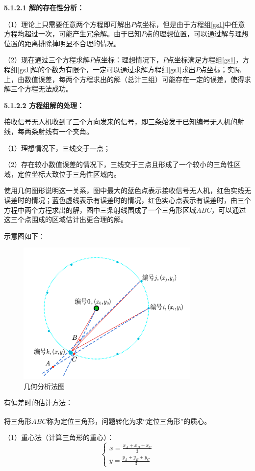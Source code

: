 \documentclass[12pt]{ctexart}
\newcommand\supercite[1]{\textsuperscript{\cite{#1}}}
\begin{document}
\begin{spacing}{1.5}
\textbf{5.1.2.1 解的存在性分析：}

（1）理论上只需要任意两个方程即可解出$P$点坐标，但是由于方程组\ref{gs1}中任意方程均超过一次，可能产生冗余解。由于已知$P$点的理想位置，可以通过解与理想位置的距离排除掉明显不合理的情况。

（2）现在通过三个方程求解$P$点坐标：理想情况下，$P$点坐标满足方程组\ref{gs1}，方程组\ref{gs1}解的个数为有限个，一定可以通过求解方程组\ref{gs1}求出$P$点坐标；实际上，由数值误差，每两个方程求出的解（总计三组）可能存在一定的误差，使得求解三个方程无法成功。

\textbf{5.1.2.2 方程组解的处理：}

接收信号无人机收到了三个方向发来的信号，即三条始发于已知编号无人机的射线，每两条射线有一个夹角。

（1）理想情况下，三线交于一点；

（2）存在较小数值误差的情况下，三线交于三点且形成了一个较小的三角性区域，定位坐标大致位于三角性区域内。

使用几何图形说明这一关系，图中最大的蓝色点表示接收信号无人机，红色实线无误差时的情况；蓝色虚线表示有误差时的情况，红色实心点表示有误差时，由三个方程中两个方程求出的解，图中三条射线围成了一个三角形区域$ABC$，可以通过这三个点围成的区域估计出更合理的解。

示意图如下：
\begin{figure}[H]
	\centering
	\includegraphics[width=0.8\textwidth]{几何分析法图.png}
	\caption{几何分析法图}
	\label{tu3}
\end{figure}

有偏差时的估计方法：

将三角形$ABC$称为定位三角形\supercite{参考文献1}，问题转化为求“定位三角形”的质心。

（1）重心法（计算三角形的重心）：
\begin{equation}
	\begin{cases}
		x=\frac{x_A+x_B+x_C}{3}\\
		y=\frac{y_A+y_B+y_C}{3}
	\end{cases}
\end{equation}


\end{spacing}
\end{document}
